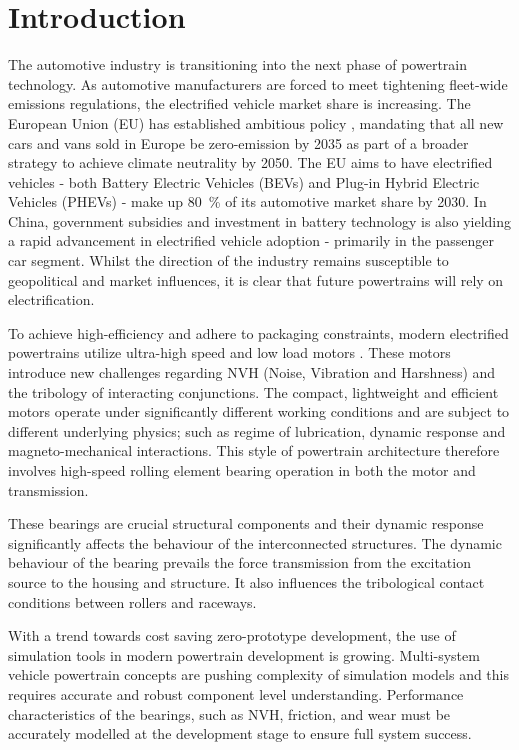 \chapter{Introduction} \label{Introduction}

The automotive industry is transitioning into the next phase of powertrain technology. As automotive manufacturers are forced to meet tightening fleet-wide emissions regulations, the electrified vehicle market share is increasing. The European Union (EU) has established ambitious policy \cite{EUL110/5}, mandating that all new cars and vans sold in Europe be zero-emission by 2035 as part of a broader strategy to achieve climate neutrality by 2050. The EU aims to have electrified vehicles - both Battery Electric Vehicles (BEVs) and Plug-in Hybrid Electric Vehicles (PHEVs) - make up 80~\% of its automotive market share by 2030. In China, government subsidies and investment in battery technology is also yielding a rapid advancement in electrified vehicle adoption - primarily in the passenger car segment. Whilst the direction of the industry remains susceptible to geopolitical and market influences, it is clear that future powertrains will rely on electrification.

To achieve high-efficiency and adhere to packaging constraints, modern electrified powertrains utilize ultra-high speed and low load motors \cite{Cai2021}. These motors introduce new challenges regarding NVH (Noise, Vibration and Harshness) and the tribology of interacting conjunctions. The compact, lightweight and efficient motors operate under significantly different working conditions and are subject to different underlying physics; such as regime of lubrication, dynamic response and magneto-mechanical interactions. This style of powertrain architecture therefore involves high-speed rolling element bearing operation in both the motor and transmission.

These bearings are crucial structural components and their dynamic response significantly affects the behaviour of the interconnected structures. The dynamic behaviour of the bearing prevails the force transmission from the excitation source to the housing and structure. It also influences the tribological contact conditions between rollers and raceways.

With a trend towards cost saving zero-prototype development, the use of simulation tools in modern powertrain development is growing. Multi-system vehicle powertrain concepts are pushing complexity of simulation models and this requires accurate and robust component level understanding. Performance characteristics of the bearings, such as NVH, friction, and wear must be accurately modelled at the development stage to ensure full system success.


